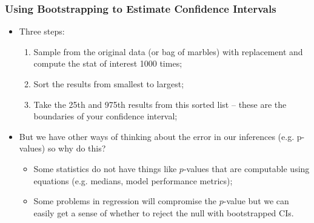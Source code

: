 \documentclass[aspectratio=169]{beamer}
\theoremstyle{principle}
\begin{document}
\begin{frame}
\frametitle{Using Bootstrapping to Estimate Confidence Intervals}

\begin{itemize}
\item Three steps:
\begin{enumerate}
\item Sample from the original data (or bag of marbles) with replacement and compute the stat of interest 1000 times;
\item Sort the results from smallest to largest; 
\item Take the 25th and 975th results from this sorted list -- these are the boundaries of your confidence interval;
\end{enumerate}
\bigskip

\item But we have other ways of thinking about the error in our inferences (e.g. p-values) so why do this?
\begin{itemize}
\item Some statistics do not have things like $p$-values that are computable using equations (e.g. medians, model performance metrics);
\item[]\color{white} Some problems in regression will compromise the $p$-value but we can easily get a sense of whether to reject the null with bootstrapped CIs.
\end{itemize}
\end{itemize}

\end{frame}
\end{document}
